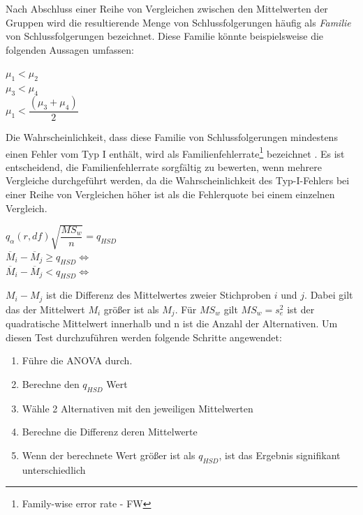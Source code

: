 Nach Abschluss einer Reihe von Vergleichen zwischen den Mittelwerten der Gruppen wird die resultierende Menge von Schlussfolgerungen 
häufig als \textit{Familie} von Schlussfolgerungen bezeichnet. Diese Familie könnte beispielsweise die folgenden Aussagen umfassen:

\begin{center}
  $\mu_1 < \mu_2$ \\
  $\mu_3 < \mu_4$ \\
  $\mu_1 < \dfrac{(\mu_3 + \mu_4)}{2}$
\end{center}

Die Wahrscheinlichkeit, dass diese Familie von Schlussfolgerungen mindestens einen Fehler vom Typ I enthält,
wird als Familienfehlerrate\footnote{Family-wise error rate - FW} bezeichnet \cite[S. 365]{tukey_hsd_book}.
Es ist entscheidend, 
die Familienfehlerrate sorgfältig zu bewerten, wenn mehrere Vergleiche durchgeführt werden,
da die Wahrscheinlichkeit des Typ-I-Fehlers
bei einer Reihe von Vergleichen höher ist als die Fehlerquote bei einem einzelnen Vergleich.


\begin{center}
  $q_{\alpha}(r, df){\sqrt{\dfrac{MS_w}{n}}} = q_{HSD}$ \\
  $\overline{M}_i - \overline{M}_j \geq q_{HSD} \iff$  \\
  $\overline{M}_i - \overline{M}_j < q_{HSD} \iff$  
\end{center}

$M_i - M_j$ ist die Differenz des Mittelwertes zweier Stichproben $i$ und $j$.
Dabei gilt das der Mittelwert $M_i$ größer ist als $M_j$.
Für $MS_w$ gilt $MS_w = s^2_{e}$ ist der quadratische Mittelwert innerhalb und n ist die Anzahl
der Alternativen.
Um diesen Test durchzuführen werden folgende Schritte angewendet:

\begin{center}
  \begin{enumerate}
    \item Führe die ANOVA durch. 
    \item Berechne den $q_{HSD}$ Wert
    \item Wähle 2 Alternativen mit den jeweiligen Mittelwerten
    \item Berechne die Differenz deren Mittelwerte
    \item Wenn der berechnete Wert größer ist als $q_{HSD}$, ist das Ergebnis signifikant unterschiedlich 
  \end{enumerate}
\end{center}


